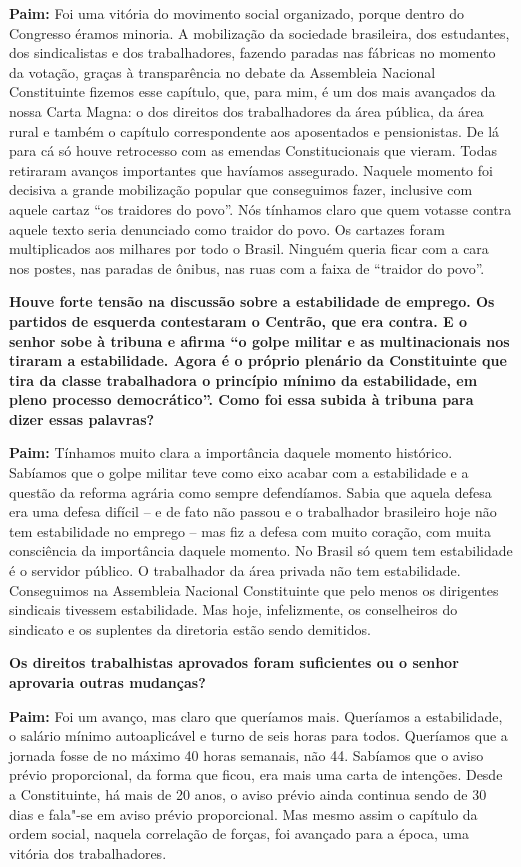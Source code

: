 \textbf{Paim:} Foi uma vitória do movimento social organizado, porque
dentro do Congresso éramos minoria. A mobilização da sociedade
brasileira, dos estudantes, dos sindicalistas e dos trabalhadores,
fazendo paradas nas fábricas no momento da votação, graças à
transparência no debate da Assembleia Nacional Constituinte fizemos esse
capítulo, que, para mim, é um dos mais avançados da nossa Carta Magna: o
dos direitos dos trabalhadores da área pública, da área rural e também o
capítulo correspondente aos aposentados e pensionistas. De lá para cá só
houve retrocesso com as emendas Constitucionais que vieram. Todas
retiraram avanços importantes que havíamos assegurado. Naquele momento
foi decisiva a grande mobilização popular que conseguimos fazer,
inclusive com aquele cartaz ``os traidores do povo''. Nós tínhamos claro
que quem votasse contra aquele texto seria denunciado como traidor do
povo. Os cartazes foram multiplicados aos milhares por todo o Brasil.
Ninguém queria ficar com a cara nos postes, nas paradas de ônibus, nas
ruas com a faixa de ``traidor do povo''.

\textbf{Houve forte tensão na discussão sobre a estabilidade de emprego.
Os partidos de esquerda contestaram o Centrão, que era contra. E o
senhor sobe à tribuna e afirma ``o golpe militar e as multinacionais nos
tiraram a estabilidade. Agora é o próprio plenário da Constituinte que
tira da classe trabalhadora o princípio mínimo da estabilidade, em pleno
processo democrático''. Como foi essa subida à tribuna para dizer essas
palavras?}

\textbf{Paim:} Tínhamos muito clara a importância daquele momento
histórico. Sabíamos que o golpe militar teve como eixo acabar com a
estabilidade e a questão da reforma agrária como sempre defendíamos.
Sabia que aquela defesa era uma defesa difícil -- e de fato não passou e
o trabalhador brasileiro hoje não tem estabilidade no emprego -- mas fiz
a defesa com muito coração, com muita consciência da importância daquele
momento. No Brasil só quem tem estabilidade é o servidor público. O
trabalhador da área privada não tem estabilidade. Conseguimos na
Assembleia Nacional Constituinte que pelo menos os dirigentes sindicais
tivessem estabilidade. Mas hoje, infelizmente, os conselheiros do
sindicato e os suplentes da diretoria estão sendo demitidos.

\textbf{Os direitos trabalhistas aprovados foram suficientes ou o senhor
aprovaria outras mudanças?}

\textbf{Paim:} Foi um avanço, mas claro que queríamos mais. Queríamos a
estabilidade, o salário mínimo autoaplicável e turno de seis horas para
todos. Queríamos que a jornada fosse de no máximo 40 horas semanais, não
44. Sabíamos que o aviso prévio proporcional, da forma que ficou, era
mais uma carta de intenções. Desde a Constituinte, há mais de 20 anos, o
aviso prévio ainda continua sendo de 30 dias e fala"-se em aviso prévio
proporcional. Mas mesmo assim o capítulo da ordem social, naquela
correlação de forças, foi avançado para a época, uma vitória dos
trabalhadores.

